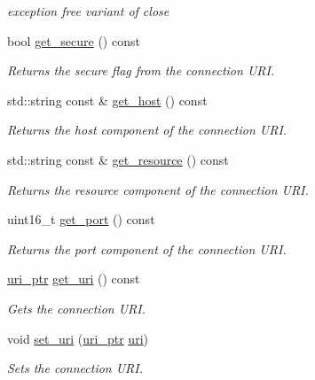 \begin{DoxyCompactItemize}
\begin{DoxyCompactList}\small\item\em exception free variant of close \end{DoxyCompactList}\item 
bool \hyperlink{classwebsocketpp_1_1connection_a38d87e9ef3c4514fcd72457a04c31260}{get\+\_\+secure} () const
\begin{DoxyCompactList}\small\item\em Returns the secure flag from the connection U\+RI. \end{DoxyCompactList}\item 
std\+::string const  \& \hyperlink{classwebsocketpp_1_1connection_a47e91744f959876b9fef4b18b04a809a}{get\+\_\+host} () const
\begin{DoxyCompactList}\small\item\em Returns the host component of the connection U\+RI. \end{DoxyCompactList}\item 
std\+::string const  \& \hyperlink{classwebsocketpp_1_1connection_a52ad47e67e1327e95d1572e04173a409}{get\+\_\+resource} () const
\begin{DoxyCompactList}\small\item\em Returns the resource component of the connection U\+RI. \end{DoxyCompactList}\item 
uint16\+\_\+t \hyperlink{classwebsocketpp_1_1connection_af6651a691ee345daf5cfd31b875965ab}{get\+\_\+port} () const
\begin{DoxyCompactList}\small\item\em Returns the port component of the connection U\+RI. \end{DoxyCompactList}\item 
\hyperlink{namespacewebsocketpp_aae370ea5ac83a8ece7712cb39fc23f5b}{uri\+\_\+ptr} \hyperlink{classwebsocketpp_1_1connection_a63f906681e9363f40dce7d2b65444a41}{get\+\_\+uri} () const
\begin{DoxyCompactList}\small\item\em Gets the connection U\+RI. \end{DoxyCompactList}\item 
void \hyperlink{classwebsocketpp_1_1connection_ac5c81acf3be998662a3500a9be2c4d38}{set\+\_\+uri} (\hyperlink{namespacewebsocketpp_aae370ea5ac83a8ece7712cb39fc23f5b}{uri\+\_\+ptr} \hyperlink{classwebsocketpp_1_1uri}{uri})
\begin{DoxyCompactList}\small\item\em Sets the connection U\+RI. \end{DoxyCompactList}\item 

\end{DoxyCompactItemize}
